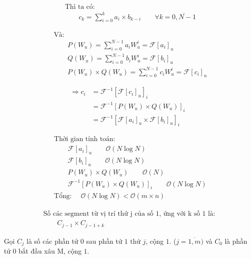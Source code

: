 \documentclass[12pt]{report}
\begin{document}
\begin{align*}
    &\textrm{Thì ta có: } \\
    &\quad\quad c_k = \sum_{i = 0} ^ {k} a_i \times b_{k - i}
    \quad\quad \forall k = \overline{0, N - 1}
\end{align*}

\begin{align*}
    &\textrm{Và: } \\
    &\quad\quad P(W_u) = \sum_{i = 0}^{N - 1} a_i W_u^i 
    = \mathcal{F}[a_i]_u \\
    &\quad\quad Q(W_u) = \sum_{i = 0}^{N - 1} b_i W_u^i 
    = \mathcal{F}[b_i]_u \\
    &\quad\quad P(W_u) \times Q(W_u) = \sum_{i = 0}^{N - 1} c_i W_u^i
    = \mathcal{F}[c_i]_u
\end{align*}

\begin{align*}
    \Rightarrow c_i 
    &= \mathcal{F}^{-1} \left[ \mathcal{F}[c_i]_u \right]_i \\
    &= \mathcal{F}^{-1} \left[ P(W_u) \times Q(W_u) \right]_i \\
    &= \mathcal{F}^{-1} \left[ 
        \mathcal{F}[a_i]_u \times
        \mathcal{F}[b_i]_u \right]_i
\end{align*}

\begin{align*}
    &\textrm{Thời gian tính toán: } \\
    &\quad\quad \mathcal{F}[a_i]_u \quad\quad \mathcal{O}(N \log N) \\
    &\quad\quad \mathcal{F}[b_i]_u \quad\quad \mathcal{O}(N \log N) \\
    &\quad\quad P(W_u) \times Q(W_u) \quad\quad \mathcal{O}(N) \\
    &\quad\quad \mathcal{F}^{-1}[P(W_u) \times Q(W_u)]_i 
    \quad\quad \mathcal{O}(N \log N) \\
    &\textrm{Tổng: } \quad \mathcal{O}(N \log N) < 
                \mathcal{O}\left(m \times n\right)
\end{align*}

\begin{align*}
    &\textrm{Số các segment từ vị trí thứ j của số 1, ứng với k 
    số 1 là: } \\
    &\quad\quad C_{j - 1} \times C_{j - 1 + k} 
\end{align*}

Gọi $C_j$ là số các phần tử $0$ sau phần tử $1$ thứ $j$, cộng $1$. 
($j = \overline{1, m})$ và $C_0$ là phần tử $0$ bắt đầu xâu M, cộng $1$.
\end{document}
